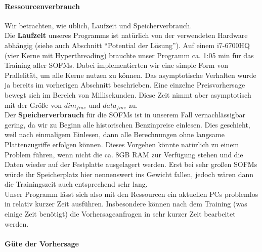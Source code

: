 \documentclass[11pt]{article}
\begin{document}
	\paragraph{Ressourcenverbrauch\\}
	Wir betrachten, wie üblich, Laufzeit und Speicherverbrauch.\\
	Die \textbf{Laufzeit} unseres Programms ist natürlich von der verwendeten Hardware abhängig (siehe auch Abschnitt "`Potential der Lösung"'). Auf einem i7-6700HQ (vier Kerne mit Hyperthreading) brauchte unser Programm ca. 1:05 min für das Training aller SOFMs. Dabei implementierten wir eine simple Form von Prallelität, um alle Kerne nutzen zu können. Das asymptotische Verhalten wurde ja bereits im vorherigen Abschnitt beschrieben. Eine einzelne Preisvorhersage bewegt sich im Bereich von Millisekunden. Diese Zeit nimmt aber asymptotisch mit der Größe von $dim_{fine}$ und $data_{fine}$ zu.\\
	Der \textbf{Speicherverbrauch} für die SOFMs ist in unserem Fall vernachlässigbar gering, da wir zu Beginn alle historischen Benzinpreise einlesen. Dies geschieht, weil nach einmaligem Einlesen, dann alle Berechnungen ohne langsame Plattenzugriffe erfolgen können. Dieses Vorgehen könnte natürlich zu einem Problem führen, wenn nicht die ca. 8GB RAM zur Verfügung stehen und die Daten wieder auf der Festplatte ausgelagert werden. Erst bei sehr großen SOFMs würde ihr Speicherplatz hier nennenswert ins Gewicht fallen, jedoch wären dann die Trainingszeit auch entsprechend sehr lang.\\
	Unser Programm lässt sich also mit den Ressourcen ein aktuellen PCs problemlos in relativ kurzer Zeit ausführen. Insbesondere können nach dem Training (was einige Zeit benötigt) die Vorhersageanfragen in sehr kurzer Zeit bearbeitet werden.
	
	\paragraph{Güte der Vorhersage\\}
	

\end{document}
